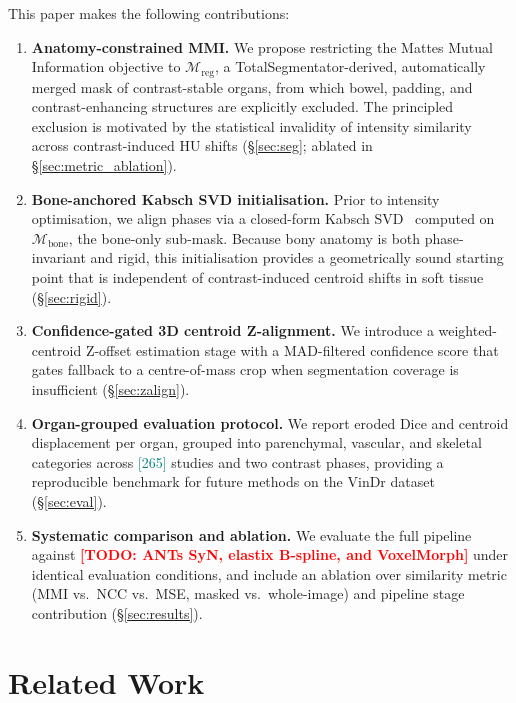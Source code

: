 \documentclass[10pt,twocolumn]{article}
\newcommand{\TODO}[1]{\textcolor{red}{\textbf{[TODO: #1]}}}
\newcommand{\NUM}[1]{\textcolor{teal}{[#1]}}
\newcommand{\Mreg}{\mathcal{M}_{\text{reg}}}
\newcommand{\Mbone}{\mathcal{M}_{\text{bone}}}
\begin{document}
This paper makes the following contributions:
%
\begin{enumerate}

  \item \textbf{Anatomy-constrained MMI.}
  We propose restricting the Mattes Mutual Information objective to
  $\Mreg$, a TotalSegmentator-derived, automatically merged mask of
  contrast-stable organs, from which bowel, padding, and
  contrast-enhancing structures are explicitly excluded.
  The principled exclusion is motivated by the statistical invalidity
  of intensity similarity across contrast-induced HU shifts
  (\S\ref{sec:seg}; ablated in \S\ref{sec:metric_ablation}).

  \item \textbf{Bone-anchored Kabsch SVD initialisation.}
  Prior to intensity optimisation, we align phases via a closed-form
  Kabsch SVD~\cite{kabsch1976} computed on $\Mbone$, the bone-only
  sub-mask.
  Because bony anatomy is both phase-invariant and rigid, this
  initialisation provides a geometrically sound starting point that
  is independent of contrast-induced centroid shifts in soft tissue
  (\S\ref{sec:rigid}).

  \item \textbf{Confidence-gated 3D centroid Z-alignment.}
  We introduce a weighted-centroid Z-offset estimation stage with a
  MAD-filtered confidence score that gates fallback to a centre-of-mass
  crop when segmentation coverage is insufficient
  (\S\ref{sec:zalign}).

  \item \textbf{Organ-grouped evaluation protocol.}
  We report eroded Dice and centroid displacement per organ, grouped
  into parenchymal, vascular, and skeletal categories across
  \NUM{265} studies and two contrast phases, providing a reproducible
  benchmark for future methods on the VinDr dataset
  (\S\ref{sec:eval}).

  \item \textbf{Systematic comparison and ablation.}
  We evaluate the full pipeline against \TODO{ANTs SyN, elastix
  B-spline, and VoxelMorph} under identical evaluation conditions,
  and include an ablation over similarity metric (MMI vs.\ NCC
  vs.\ MSE, masked vs.\ whole-image) and pipeline stage contribution
  (\S\ref{sec:results}).

\end{enumerate}

\section{Related Work}
\label{sec:related}
\end{document}
